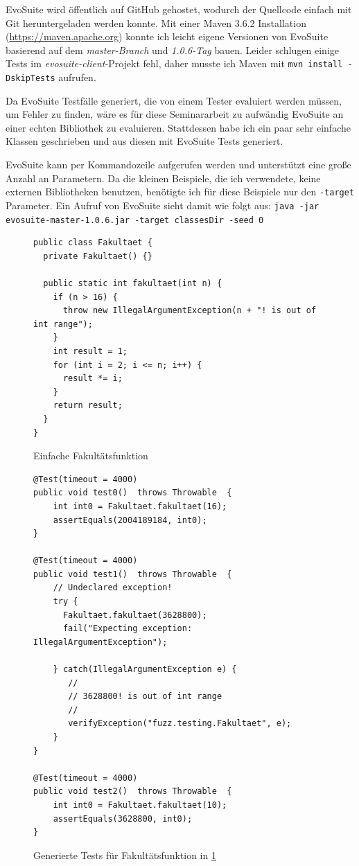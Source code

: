 \documentclass[a4paper,11pt]{article}
\begin{document}
EvoSuite wird öffentlich auf GitHub gehostet, wodurch der Quellcode einfach mit Git heruntergeladen werden konnte.
Mit einer Maven 3.6.2 Installation (\url{https://maven.apache.org}) konnte ich leicht eigene Versionen von EvoSuite basierend auf dem \textit{master-Branch} und \textit{1.0.6-Tag} bauen.
Leider schlugen einige Tests im \textit{evosuite-client}-Projekt fehl, daher musste ich Maven mit \texttt{mvn install -DskipTests} aufrufen.

Da EvoSuite Testfälle generiert, die von einem Tester evaluiert werden müssen, um Fehler zu finden, wäre es für diese Seminararbeit zu aufwändig EvoSuite an einer echten Bibliothek zu evaluieren.
Stattdessen habe ich ein paar sehr einfache Klassen geschrieben und aus diesen mit EvoSuite Tests generiert.

EvoSuite kann per Kommandozeile aufgerufen werden und unterstützt eine große Anzahl an Parametern.
Da die kleinen Beispiele, die ich verwendete, keine externen Bibliotheken benutzen, benötigte ich für diese Beispiele nur den \texttt{-target} Parameter.
Ein Aufruf von EvoSuite sieht damit wie folgt aus: \texttt{java -jar evosuite-master-1.0.6.jar -target classesDir -seed 0}

\begin{figure}[h]
	\begin{lstlisting}[basicstyle=\ttfamily\tiny]
public class Fakultaet {
  private Fakultaet() {}

  public static int fakultaet(int n) {
    if (n > 16) {
      throw new IllegalArgumentException(n + "! is out of int range");
    }
    int result = 1;
    for (int i = 2; i <= n; i++) {
      result *= i;
    }
    return result;
  }
}
	\end{lstlisting}
	\caption{Einfache Fakultätsfunktion}
	\label{fig:fakultaet}
\end{figure}

\begin{figure}[h]
	\begin{lstlisting}[basicstyle=\ttfamily\tiny]
@Test(timeout = 4000)
public void test0()  throws Throwable  {
    int int0 = Fakultaet.fakultaet(16);
    assertEquals(2004189184, int0);
}

@Test(timeout = 4000)
public void test1()  throws Throwable  {
    // Undeclared exception!
    try { 
      Fakultaet.fakultaet(3628800);
      fail("Expecting exception: IllegalArgumentException");
    
    } catch(IllegalArgumentException e) {
       //
       // 3628800! is out of int range
       //
       verifyException("fuzz.testing.Fakultaet", e);
    }
}

@Test(timeout = 4000)
public void test2()  throws Throwable  {
    int int0 = Fakultaet.fakultaet(10);
    assertEquals(3628800, int0);
}
	\end{lstlisting}
	\caption{Generierte Tests für Fakultätsfunktion in \cref{fig:fakultaet}}
	\label{fig:fakultaet_tests}
\end{figure}
\end{document}
